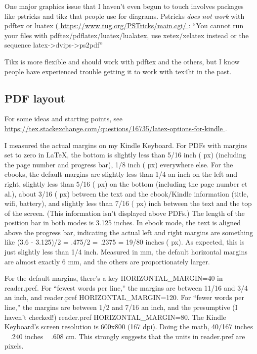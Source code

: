\documentclass[12pt]{article}
\begin{document}
One major graphics issue that I haven't even begun to touch involves
packages like pstricks and tikz that people use for diagrams.
Pstricks \emph{does not work} with pdftex or luatex (\url{
https://www.tug.org/PSTricks/main.cgi/
}: ``You cannot run your files with pdftex/pdflatex/luatex/lualatex, use xetex/xelatex instead or the sequence latex->dvips->ps2pdf''

Tikz is more flexible and should work with pdftex and the others, but
I know people have experienced trouble getting it to work with tex4ht
in the past.


\subsection{PDF layout}
\label{sec:pdf}

For some ideas and starting points, see \url{
  https://tex.stackexchange.com/questions/16735/latex-options-for-kindle
}.

I measured the actual margins on my Kindle Keyboard.  For PDFs with
margins set to zero in \LaTeX, the bottom is slightly less than 5/16
inch ( px) (including the page number and progress bar), 1/8
inch ( px) everywhere else.  For the ebooks, the default
margins are slightly less than 1/4 an inch on the left and right,
slightly less than 5/16 ( px) on the bottom (including the
page number et al.), about 3/16 ( px) between the text and
the ebook/Kindle information (title, wifi, battery), and slightly less
than 7/16 ( px) inch between the text and the top of the
screen.  (This information isn't displayed above PDFs.)  The length of
the position bar in both modes is 3.125 inches.  In ebook mode, the
text is aligned above the progress bar, indicating the actual left and
right margins are something like (3.6 - 3.125)/2 = .475/2 = .2375 =
19/80 inches ( px).  As expected, this is just slightly less
than 1/4 inch.  Measured in mm, the default horizontal margins are
almost exactly 6 mm, and the others are proportionately larger.

For the default margins, there's a key HORIZONTAL_MARGIN=40 in
reader.pref.  For ``fewest words per line,'' the margins are between
11/16 and 3/4 an inch, and reader.pref HORIZONTAL_MARGIN=120.  For
``fewer words per line,'' the margins are between 1/2 and 7/16 an
inch, and the presumptive (I haven't checked!)  reader.pref
HORIZONTAL_MARGIN=80.  The Kindle Keyboard's screen resolution is
600x800 (167 dpi).  Doing the math, 40/167 inches ~ .240 inches ~ .608
cm.  This strongly suggests that the units in reader.pref are pixels.
\end{document}
